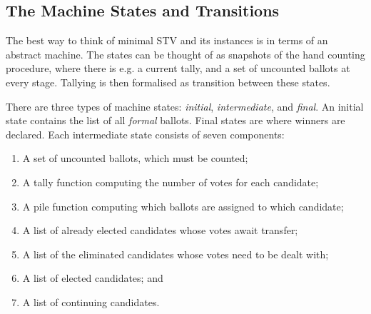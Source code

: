 \documentclass{llncs}
\begin{document}

\subsection{The Machine States and Transitions}

The best way to think of minimal STV and its instances is in terms
of an abstract machine. The states can be thought of
as snapshots of the hand counting procedure, where there is e.g. a
current tally, and a set of uncounted ballots at every stage.
Tallying is then formalised as transition between these states. 

There are three types of machine states: \emph{initial},
\emph{intermediate}, and \emph{final}. An initial state contains
the list of all \emph{formal} ballots. 
Final states 
are 
where
winners 
are declared. Each intermediate state
consists of seven components: 
\begin{enumerate}
\item A set of uncounted ballots, which must be counted;
\item A tally function computing the number of votes for each candidate;
\item A pile function computing which ballots are assigned to which candidate;
\item A list of already elected candidates whose votes await transfer;
\item A list of the eliminated candidates whose votes need to be dealt with;
\item A list of elected candidates; and
\item A list of continuing candidates.
\end{enumerate}  
\end{document}
